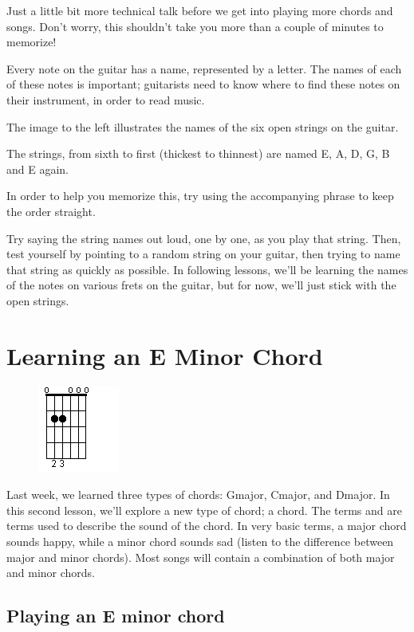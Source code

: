 Just a little bit more technical talk before we get into playing more chords
and songs. Don't worry, this shouldn't take you more than a couple of minutes
to memorize!

Every note on the guitar has a name, represented by a letter. The names of each
of these notes is important; guitarists need to know where to find these notes
on their instrument, in order to read music.

The image to the left illustrates the names of the six open strings on the guitar.

The strings, from sixth to first (thickest to thinnest) are named E, A, D, G, B
and E again.

In order to help you memorize this, try using the accompanying phrase  to keep the order straight.

Try saying the string names out loud, one by one, as you play that string.
Then, test yourself by pointing to a random string on your guitar, then trying
to name that string as quickly as possible. In following lessons, we'll be
learning the names of the notes on various frets on the guitar, but for now,
we'll just stick with the open strings.

\section{Learning an E Minor Chord}
\begin{figure}
\includegraphics{parttwo/openeminor.png}
\end{figure}

Last week, we learned three types of chords: Gmajor, Cmajor, and Dmajor. In
this second lesson, we'll explore a new type of chord; a  chord. The
terms  and  are terms used to describe the sound of the chord. In
very basic terms, a major chord sounds happy, while a minor chord sounds sad
(listen to the difference between major and minor chords). Most songs will
contain a combination of both major and minor chords.

\subsection{Playing an E minor chord}

